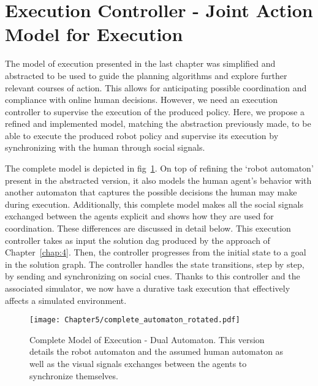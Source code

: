 \section{Execution Controller - Joint Action Model for Execution}

The model of execution presented in the last chapter was simplified and abstracted to be used to guide the planning algorithms and explore further relevant courses of action. This allows for anticipating possible coordination and compliance with online human decisions. 
However, we need an execution controller to supervise the execution of the produced policy. Here, we propose a refined and implemented model, matching the abstraction previously made, to be able to execute the produced robot policy and supervise its execution by synchronizing with the human through social signals.

The complete model is depicted in fig~\ref{fig:complete_model_exec}. On top of refining the `robot automaton' present in the abstracted version, it also models the human agent's behavior with another automaton that captures the possible decisions the human may make during execution. Additionally, this complete model makes all the social signals exchanged between the agents explicit and shows how they are used for coordination. These differences are discussed in detail below. This execution controller takes as input the solution \acrshort{dag} produced by the approach of Chapter~\ref{chap:4}. Then, the controller progresses from the initial state to a goal in the solution graph. The controller handles the state transitions, step by step, by sending and synchronizing on social cues. Thanks to this controller and the associated simulator, we now have a durative task execution that effectively affects a simulated environment.


\begin{figure}
    \centering
    \texttt{[image: Chapter5/complete\_automaton\_rotated.pdf]}
    \caption{Complete Model of Execution - Dual Automaton. This version details the robot automaton and the assumed human automaton as well as the visual signals exchanges between the agents to synchronize themselves.}
    \label{fig:complete_model_exec}
\end{figure}

